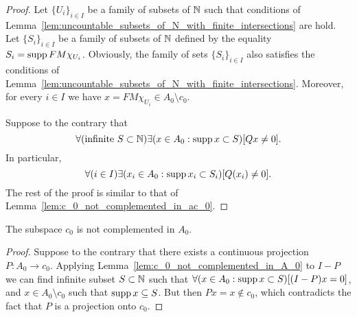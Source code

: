 \begin{proof}
	Let $\{U_i\}_{i \in I}$ be a family of subsets of $\mathbb{N}$
	such that conditions of Lemma~\ref{lem:uncountable_subsets_of_N_with_finite_intersections} are hold.
	Let $\{S_i\}_{i \in I}$ be a family of subsets of $\mathbb{N}$
	defined by the equality $S_i = \operatorname{supp} FM\chi_{U_i}$.
	Obviously, the family of sets $\{S_i\}_{i \in I}$ also
	satisfies the conditions of Lemma~\ref{lem:uncountable_subsets_of_N_with_finite_intersections}.
	Moreover, for every $i\in I$ we have $x = FM\chi_{U_i} \in A_0\setminus c_0$.

	Suppose to the contrary that
	\begin{equation}
		\forall(\mbox{infinite }S\subset\mathbb{N})\exists(x \in A_0 : \operatorname{supp} x \subset S)[Qx \neq 0]
		.
	\end{equation}
	In particular,
	\begin{equation}
		\forall(i\in I)\exists(x_i \in A_0 : \operatorname{supp} x_i \subset S_i)[Q(x_i) \neq 0]
		.
	\end{equation}
	The rest of the proof is similar to that of Lemma~\ref{lem:c_0_not_complemented_in_ac_0}.

\end{proof}

\begin{theorem}
	The subspace $c_0$ is not complemented in $A_0$.
\end{theorem}

\begin{proof}
	Suppose to the contrary that
	there exists a continuous projection $P: A_0 \to c_0$.
	Applying Lemma~\ref{lem:c_0_not_complemented_in_A_0} to $I-P$
	we can find infinite subset $S\subset\mathbb{N}$
	such that $\forall(x\in A_0 : \operatorname{supp} x \subset S)[(I-P)x = 0]$,
	and $x\in A_0 \setminus c_0$ such that $\operatorname{supp} x \subseteq S$.
	But then $Px = x\notin c_0$,
	which contradicts  the fact  that $P$ is a projection onto $c_0$.
\end{proof}

